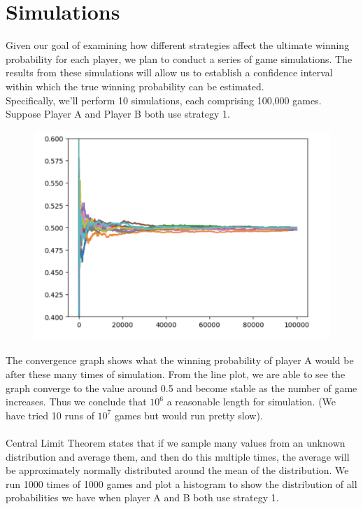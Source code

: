 \documentclass[12pt]{article}
\begin{document}
\section{Simulations}
Given our goal of examining how different strategies affect the ultimate winning probability for each player, we plan to conduct a series of game simulations. The results from these simulations will allow us to establish a confidence interval within which the true winning probability can be estimated.\\
Specifically, we'll perform 10 simulations, each comprising 100,000 games. Suppose Player A and Player B both use strategy 1.
\begin{figure}[H]
\centering
\includegraphics[scale=0.5]{convergence graph.png}
\end{figure}
The convergence graph shows what the winning probability of player A would be after these many times of simulation. From the line plot, we are able to see the graph converge to the value around 0.5 and become stable as the number of game increases. Thus we conclude that $10^6 $ a reasonable length for simulation. (We have tried 10 runs of $10^7$ games but would run pretty slow).
~\\\\
Central Limit Theorem states that if we sample many values from an unknown distribution and average them, and then do this multiple times, the average will be approximately normally distributed around the mean of the distribution.
We run 1000 times of 1000 games and plot a histogram to show the distribution of all probabilities we have when player A and B both use strategy 1. 
\end{document}
